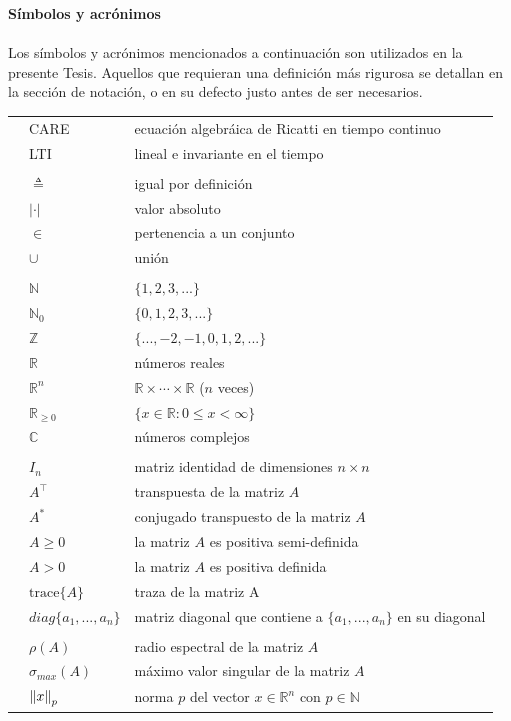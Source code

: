 \clearpage
\setlength{\parindent}{0cm}
    \vspace{15mm}
	{\huge {\bf Símbolos y acrónimos}}\\
\vspace{0.5cm}
	\large
	\\

Los símbolos y acrónimos mencionados a continuación son utilizados en la presente Tesis. Aquellos que requieran una definición más rigurosa se detallan en la sección de notación, o en su defecto justo antes de ser necesarios.

\begin{tabular}{p{0.3cm} p{2.7cm} p{16cm}}
&CARE& ecuación algebráica de Ricatti en tiempo continuo \\
&LTI& lineal e invariante en el tiempo \\
& & \\
&$\triangleq$& igual por definición \\
&$| \cdot |$& valor absoluto \\
&$\in$ & pertenencia a un conjunto \\
&$\cup$ & unión \\
& & \\
&$\mathbb{N}$ & $\{ 1,2,3,...\}$ \\
&$\mathbb{N}_0$& $\{ 0,1,2,3,...\}$ \\
&$\mathbb{Z}$ & $\{ ...,-2,-1,0,1,2,... \}$ \\
&$\mathbb{R}$& números reales \\
&$\mathbb{R}^n$& $\mathbb{R} \times \cdots \times \mathbb{R} $ ($n$ veces) \\
&$\mathbb{R}_{\geq 0}$& $\{ x\in \mathbb{R}: 0 \leq x < \infty \}$\\
&$\mathbb{C}$& números complejos\\
& & \\
&$I_n$& matriz identidad de dimensiones $n \times n$ \\
&$A^{\top}$& transpuesta de la matriz $A$ \\
&$A^{*}$& conjugado transpuesto de la matriz $A$ \\
&$A\geq 0$& la matriz $A$ es positiva semi-definida \\
&$A>0$& la matriz $A$ es positiva definida \\
&$\textrm{trace}\{A\}$ & traza de la matriz A \\
&$diag\{ a_1,...,a_n\}$ & matriz diagonal que contiene a $\{ a_1,...,a_n\}$ en su diagonal \\
& & \\
&$\rho(A)$& radio espectral de la matriz $A$ \\
&$\sigma_{max}(A)$& máximo valor singular de la matriz $A$ \\
&$\left\lVert x\right\rVert_p$ & norma $p$ del vector $x\in \mathbb{R}^{n}$ con $p\in \mathbb{N}$\\
\end{tabular}

